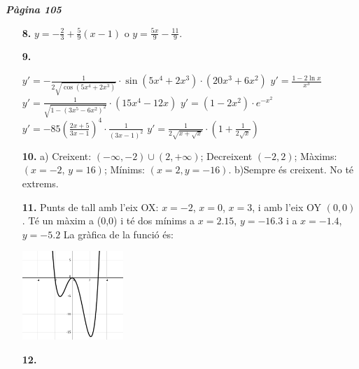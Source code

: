 \documentclass[a4paper, pdf, twoside]{book}
\begin{document}
\begin{multicols}{2}

{\textbf{\em Pàgina 105}} \hrulefill
\begin{enumerate}
\vspace{0.25cm}
\item[\fontfamily{phv}\selectfont\color{blue}\textbf{8. }]  \scalebox{0.6}{\simbolclau } 
$y=-\frac {2}{3}+\frac {5}{9}(x-1)$ o $y=\frac {5x}{9}-\frac {11}{9}$.
 \end{enumerate}
\begin{enumerate}
\vspace{0.25cm}
\item[\fontfamily{phv}\selectfont\color{blue}\textbf{9. }]  \scalebox{0.6}{\simbolclau } 
\begin{tasks} \task $y'=-\frac {1}{2\sqrt {\cos (5x^4+2x^3)}}\cdot \sin (5x^4+2x^3) \cdot (20x^3+6x^2)$ \task $y'=\frac {1-2\ln x}{x^3}$ \task $y'=\frac {1}{\sqrt {1-(3x^5-6x^2)^2}}\cdot (15x^4-12x)$ \task $y'=(1-2x^2)\cdot e^{-x^2}$ \task $y'=-85\left ( \frac {2x+5}{3x-1} \right )^4 \cdot \frac {1}{(3x-1)^2}$ \task $y'=\frac {1}{2\sqrt {x+\sqrt {x}}}\cdot (1+\frac {1}{2\sqrt {x}})$ \end{tasks}
\vspace{0.25cm}
\item[\fontfamily{phv}\selectfont\color{blue}\textbf{10. }]  \scalebox{0.6}{\simbolclau } 
a) Creixent: $(-\infty , -2)\cup (2,+\infty )$; Decreixent $(-2,2)$; Màxims: $(x=-2,\, y=16)$; Mínims: $(x=2, y=-16)$. b)Sempre és creixent. No té extrems.
\vspace{0.25cm}
\item[\fontfamily{phv}\selectfont\color{blue}\textbf{11. }]  \scalebox{0.6}{\simbolclau } 
Punts de tall amb l'eix OX: $x=-2$, $x=0$, $x=3$, i amb l'eix OY $(0,0)$. Té un màxim a (0,0) i té dos mínims a $x=2.15$, $y=-16.3$ i a $x=-1.4$, $y=-5.2$ La gràfica de la funció és: \par \includegraphics [width=0.3\textwidth ]{img-07-bloc2/sol-bloc2-polinomi1.png} 
\vspace{0.25cm}
\item[\fontfamily{phv}\selectfont\color{blue}\textbf{12. }]  \scalebox{0.6}{\simbolclau } 

\end{enumerate}
\end{multicols}
\end{document}
